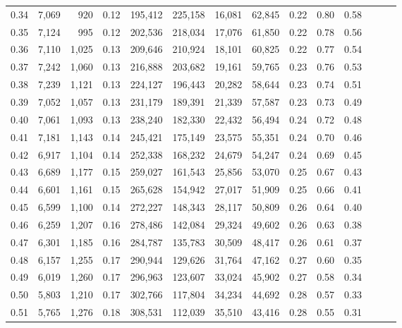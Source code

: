 \begin{tabular}{rrrrrrrrrrrrrr}
0.34 &   7,069 &    920 &  0.12 &  195,412 &  225,158 &  16,081 &  62,845 &  0.22 &  0.80 &      0.58 \\
0.35 &   7,124 &    995 &  0.12 &  202,536 &  218,034 &  17,076 &  61,850 &  0.22 &  0.78 &      0.56 \\
0.36 &   7,110 &  1,025 &  0.13 &  209,646 &  210,924 &  18,101 &  60,825 &  0.22 &  0.77 &      0.54 \\
0.37 &   7,242 &  1,060 &  0.13 &  216,888 &  203,682 &  19,161 &  59,765 &  0.23 &  0.76 &      0.53 \\
0.38 &   7,239 &  1,121 &  0.13 &  224,127 &  196,443 &  20,282 &  58,644 &  0.23 &  0.74 &      0.51 \\
0.39 &   7,052 &  1,057 &  0.13 &  231,179 &  189,391 &  21,339 &  57,587 &  0.23 &  0.73 &      0.49 \\
0.40 &   7,061 &  1,093 &  0.13 &  238,240 &  182,330 &  22,432 &  56,494 &  0.24 &  0.72 &      0.48 \\
0.41 &   7,181 &  1,143 &  0.14 &  245,421 &  175,149 &  23,575 &  55,351 &  0.24 &  0.70 &      0.46 \\
0.42 &   6,917 &  1,104 &  0.14 &  252,338 &  168,232 &  24,679 &  54,247 &  0.24 &  0.69 &      0.45 \\
0.43 &   6,689 &  1,177 &  0.15 &  259,027 &  161,543 &  25,856 &  53,070 &  0.25 &  0.67 &      0.43 \\
0.44 &   6,601 &  1,161 &  0.15 &  265,628 &  154,942 &  27,017 &  51,909 &  0.25 &  0.66 &      0.41 \\
0.45 &   6,599 &  1,100 &  0.14 &  272,227 &  148,343 &  28,117 &  50,809 &  0.26 &  0.64 &      0.40 \\
0.46 &   6,259 &  1,207 &  0.16 &  278,486 &  142,084 &  29,324 &  49,602 &  0.26 &  0.63 &      0.38 \\
0.47 &   6,301 &  1,185 &  0.16 &  284,787 &  135,783 &  30,509 &  48,417 &  0.26 &  0.61 &      0.37 \\
0.48 &   6,157 &  1,255 &  0.17 &  290,944 &  129,626 &  31,764 &  47,162 &  0.27 &  0.60 &      0.35 \\
0.49 &   6,019 &  1,260 &  0.17 &  296,963 &  123,607 &  33,024 &  45,902 &  0.27 &  0.58 &      0.34 \\
0.50 &   5,803 &  1,210 &  0.17 &  302,766 &  117,804 &  34,234 &  44,692 &  0.28 &  0.57 &      0.33 \\
0.51 &   5,765 &  1,276 &  0.18 &  308,531 &  112,039 &  35,510 &  43,416 &  0.28 &  0.55 &      0.31 \\

\end{tabular}
